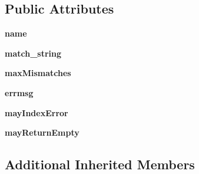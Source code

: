 \subsection*{Public Attributes}
\begin{DoxyCompactItemize}
\item 
\mbox{\label{classsetuptools_1_1__vendor_1_1pyparsing_1_1_close_match_a7a712a76f95de0feb148dc005c5ce84c}} 
{\bfseries name}
\item 
\mbox{\label{classsetuptools_1_1__vendor_1_1pyparsing_1_1_close_match_a717c8499857f03bde71d746886e3ea51}} 
{\bfseries match\+\_\+string}
\item 
\mbox{\label{classsetuptools_1_1__vendor_1_1pyparsing_1_1_close_match_af76c254b5a92646c9c833680a31d7c90}} 
{\bfseries max\+Mismatches}
\item 
\mbox{\label{classsetuptools_1_1__vendor_1_1pyparsing_1_1_close_match_ad1847edc326a14e68c1691f7234e3c58}} 
{\bfseries errmsg}
\item 
\mbox{\label{classsetuptools_1_1__vendor_1_1pyparsing_1_1_close_match_afee89d3c8f52713f9f51ce2cc9136665}} 
{\bfseries may\+Index\+Error}
\item 
\mbox{\label{classsetuptools_1_1__vendor_1_1pyparsing_1_1_close_match_a3c666f0a5cefc4f12adbf1006eda5504}} 
{\bfseries may\+Return\+Empty}
\end{DoxyCompactItemize}
\subsection*{Additional Inherited Members}


